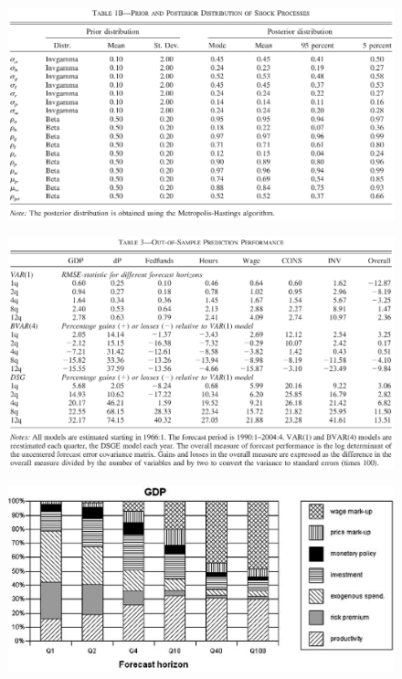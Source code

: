 \documentclass{beamer}
\begin{document}
\begin{frame}
  \begin{figure}
    \includegraphics{sw_table1b.eps}
  \end{figure}
\end{frame}

\begin{frame}
  \begin{figure}
    \includegraphics{sw_table3.eps}
  \end{figure}
\end{frame}

\begin{frame}
  \begin{figure}
    \includegraphics{sw_figure1_gdp.eps}
  \end{figure}
\end{frame}
\end{document}
